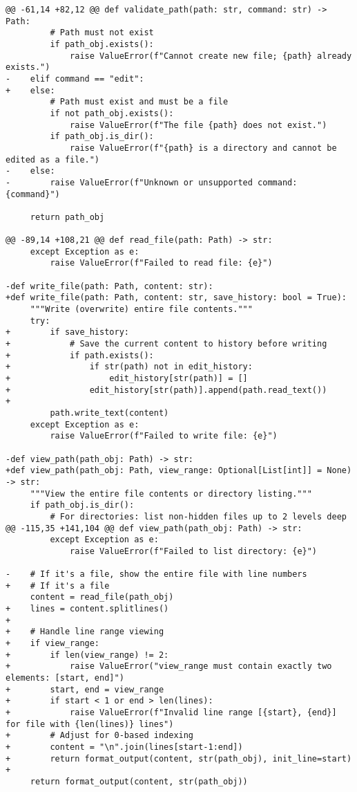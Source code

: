 \begin{lstlisting}[style=diffstyle]
@@ -61,14 +82,12 @@ def validate_path(path: str, command: str) -> Path:
         # Path must not exist
         if path_obj.exists():
             raise ValueError(f"Cannot create new file; {path} already exists.")
-    elif command == "edit":
+    else:
         # Path must exist and must be a file
         if not path_obj.exists():
             raise ValueError(f"The file {path} does not exist.")
         if path_obj.is_dir():
             raise ValueError(f"{path} is a directory and cannot be edited as a file.")
-    else:
-        raise ValueError(f"Unknown or unsupported command: {command}")
 
     return path_obj
 
@@ -89,14 +108,21 @@ def read_file(path: Path) -> str:
     except Exception as e:
         raise ValueError(f"Failed to read file: {e}")
 
-def write_file(path: Path, content: str):
+def write_file(path: Path, content: str, save_history: bool = True):
     """Write (overwrite) entire file contents."""
     try:
+        if save_history:
+            # Save the current content to history before writing
+            if path.exists():
+                if str(path) not in edit_history:
+                    edit_history[str(path)] = []
+                edit_history[str(path)].append(path.read_text())
+
         path.write_text(content)
     except Exception as e:
         raise ValueError(f"Failed to write file: {e}")
 
-def view_path(path_obj: Path) -> str:
+def view_path(path_obj: Path, view_range: Optional[List[int]] = None) -> str:
     """View the entire file contents or directory listing."""
     if path_obj.is_dir():
         # For directories: list non-hidden files up to 2 levels deep
@@ -115,35 +141,104 @@ def view_path(path_obj: Path) -> str:
         except Exception as e:
             raise ValueError(f"Failed to list directory: {e}")
 
-    # If it's a file, show the entire file with line numbers
+    # If it's a file
     content = read_file(path_obj)
+    lines = content.splitlines()
+
+    # Handle line range viewing
+    if view_range:
+        if len(view_range) != 2:
+            raise ValueError("view_range must contain exactly two elements: [start, end]")
+        start, end = view_range
+        if start < 1 or end > len(lines):
+            raise ValueError(f"Invalid line range [{start}, {end}] for file with {len(lines)} lines")
+        # Adjust for 0-based indexing
+        content = "\n".join(lines[start-1:end])
+        return format_output(content, str(path_obj), init_line=start)
+
     return format_output(content, str(path_obj))
 

\end{lstlisting}
